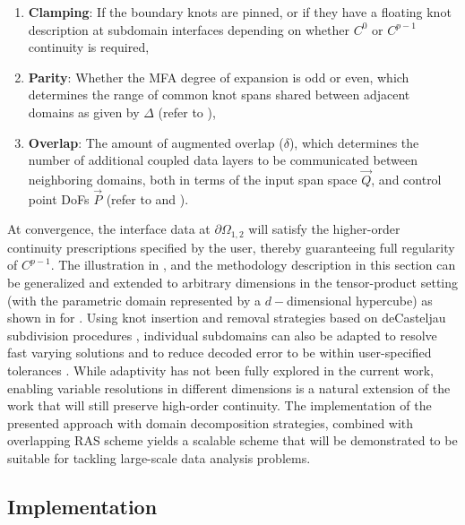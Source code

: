\begin{enumerate}
	\item \textbf{Clamping}: If the boundary knots are pinned, or if they have a floating knot description at subdomain interfaces depending on whether $C^0$ or $C^{p-1}$ continuity is required,
	\item \textbf{Parity}: Whether the MFA degree of expansion is odd or even, which determines the range of common knot spans shared between adjacent domains as given by $\Delta$ (refer to ),
	\item \textbf{Overlap}: The amount of augmented overlap ($\delta$), which determines the number of additional coupled data layers to be communicated between neighboring domains, both in terms of the input span space $\vec{Q}$, and control point DoFs $\vec{P}$ (refer to  and ).
\end{enumerate}

At convergence, the interface data at $\partial \Omega_{1,2}$ will satisfy the higher-order continuity prescriptions specified by the user, thereby guaranteeing full regularity of $C^{p-1}$. The illustration in , and the methodology description in this section can be generalized and extended to arbitrary dimensions in the tensor-product setting (with the parametric domain represented by a $d-$dimensional hypercube) as shown in  for . Using knot insertion and removal strategies based on deCasteljau subdivision procedures \cite{nurbs-book}, individual subdomains can also be adapted to resolve fast varying solutions and to reduce decoded error to be within user-specified tolerances \cite{nashed-rational}. While adaptivity has not been fully explored in the current work, enabling variable resolutions in different dimensions is a natural extension of the work that will still preserve high-order continuity.
The implementation of the presented approach with domain decomposition strategies, combined with overlapping RAS scheme yields a scalable scheme that will be demonstrated to be suitable for tackling large-scale data analysis problems.

\subsection{Implementation}
\label{sec:implementation}


